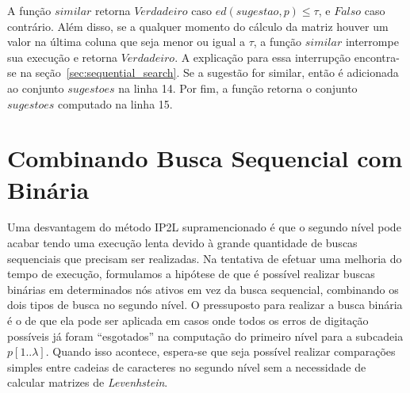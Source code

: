 A função $similar$ retorna $Verdadeiro$ caso $ed(sugestao, p) \leq \tau$, e $Falso$ caso contrário. Além disso, se a qualquer momento do cálculo da matriz houver um valor na última coluna que seja menor ou igual a $\tau$, a função $similar$ interrompe sua execução e retorna $Verdadeiro$. A explicação para essa interrupção encontra-se na seção~\ref{sec:sequential_search}. Se a sugestão for similar, então é adicionada ao conjunto $sugestoes$ na linha 14. Por fim, a função retorna o conjunto $sugestoes$ computado na linha 15.



\section{Combinando Busca Sequencial com Binária}
\label{sec:IP2LB}

Uma desvantagem do método IP2L supramencionado é que o segundo nível pode acabar tendo uma execução lenta devido à grande quantidade de buscas sequenciais que precisam ser realizadas. Na tentativa de efetuar uma melhoria do tempo de execução, formulamos a hipótese de que é possível realizar buscas binárias em determinados nós ativos em vez da busca sequencial, combinando os dois tipos de busca no segundo nível. O pressuposto para realizar a busca binária é o de que ela pode ser aplicada em casos onde todos os erros de digitação possíveis já foram ``esgotados'' na computação do primeiro nível para a subcadeia $p[1..\lambda]$. Quando isso acontece, espera-se que seja possível realizar comparações simples entre cadeias de caracteres no segundo nível sem a necessidade de calcular matrizes de \textit{Levenhstein}.


